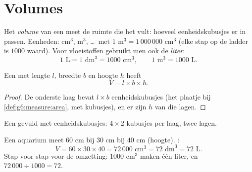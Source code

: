 \section{Volumes}

\begin{definition}[Volume]\label{def:g6:measure:volume}
Het \emph{volume} van een  meet de ruimte die het vult:
hoeveel eenheidskubusjes er in passen. Eenheden: cm$^3$, m$^3$, \dots\ met
$1$ m$^3 = 1\,000\,000$ cm$^3$ (elke stap op de ladder is $1000$ waard). Voor
vloeistoffen gebruikt men ook de \emph{liter}:
\[
1 \text{ L} = 1 \text{ dm}^3 = 1000 \text{ cm}^3,
\qquad
1 \text{ m}^3 = 1000 \text{ L}.
\]
\end{definition}

\begin{proposition}\label{prop:g6:measure:box}
Een  met lengte $l$, breedte $b$ en hoogte $h$ heeft 
\[
V = l \times b \times h .
\]
\end{proposition}

\begin{proof}
De onderste laag bevat $l \times b$ eenheidskubusjes (het plaatje bij
\cref{def:g6:measure:area}, met kubusjes), en er zijn $h$ van die lagen.
\end{proof}

\begin{omfigure}

{\small Een  gevuld met eenheidskubusjes: $4 \times 2$ kubusjes per laag,
twee lagen.}
\end{omfigure}

\begin{example}\label{ex:g6:measure:aquarium}
Een aquarium meet $60$ cm bij $30$ cm bij $40$ cm (hoogte). :
\[
V = 60 \times 30 \times 40 = 72\,000 \text{ cm}^3 = 72 \text{ dm}^3
= 72 \text{ L}.
\]
Stap voor stap voor de omzetting: $1000$ cm$^3$ maken één liter, en
$72\,000 \div 1000 = 72$.
\end{example}

